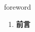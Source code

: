 
\begin{frame}
{\huge foreword}
\begin{center}
\begin{enumerate}\Large
  \item \textbf{前言}
\end{enumerate}
\end{center}
\end{frame}
